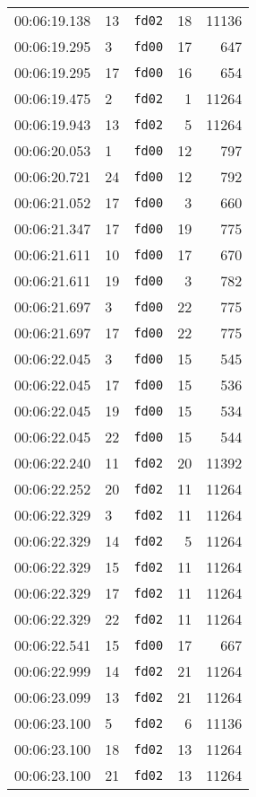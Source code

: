 \documentclass{article}
\begin{document}
\begin{longtable}{lllrr}
00:06:19.138 & 13 & \texttt{fd02} & 18 & 11136 \\
00:06:19.295 & 3 & \texttt{fd00} & 17 & 647 \\
00:06:19.295 & 17 & \texttt{fd00} & 16 & 654 \\
00:06:19.475 & 2 & \texttt{fd02} & 1 & 11264 \\
00:06:19.943 & 13 & \texttt{fd02} & 5 & 11264 \\
00:06:20.053 & 1 & \texttt{fd00} & 12 & 797 \\
00:06:20.721 & 24 & \texttt{fd00} & 12 & 792 \\
00:06:21.052 & 17 & \texttt{fd00} & 3 & 660 \\
00:06:21.347 & 17 & \texttt{fd00} & 19 & 775 \\
00:06:21.611 & 10 & \texttt{fd00} & 17 & 670 \\
00:06:21.611 & 19 & \texttt{fd00} & 3 & 782 \\
00:06:21.697 & 3 & \texttt{fd00} & 22 & 775 \\
00:06:21.697 & 17 & \texttt{fd00} & 22 & 775 \\
00:06:22.045 & 3 & \texttt{fd00} & 15 & 545 \\
00:06:22.045 & 17 & \texttt{fd00} & 15 & 536 \\
00:06:22.045 & 19 & \texttt{fd00} & 15 & 534 \\
00:06:22.045 & 22 & \texttt{fd00} & 15 & 544 \\
00:06:22.240 & 11 & \texttt{fd02} & 20 & 11392 \\
00:06:22.252 & 20 & \texttt{fd02} & 11 & 11264 \\
00:06:22.329 & 3 & \texttt{fd02} & 11 & 11264 \\
00:06:22.329 & 14 & \texttt{fd02} & 5 & 11264 \\
00:06:22.329 & 15 & \texttt{fd02} & 11 & 11264 \\
00:06:22.329 & 17 & \texttt{fd02} & 11 & 11264 \\
00:06:22.329 & 22 & \texttt{fd02} & 11 & 11264 \\
00:06:22.541 & 15 & \texttt{fd00} & 17 & 667 \\
00:06:22.999 & 14 & \texttt{fd02} & 21 & 11264 \\
00:06:23.099 & 13 & \texttt{fd02} & 21 & 11264 \\
00:06:23.100 & 5 & \texttt{fd02} & 6 & 11136 \\
00:06:23.100 & 18 & \texttt{fd02} & 13 & 11264 \\
00:06:23.100 & 21 & \texttt{fd02} & 13 & 11264 \\

\end{longtable}
\end{document}
